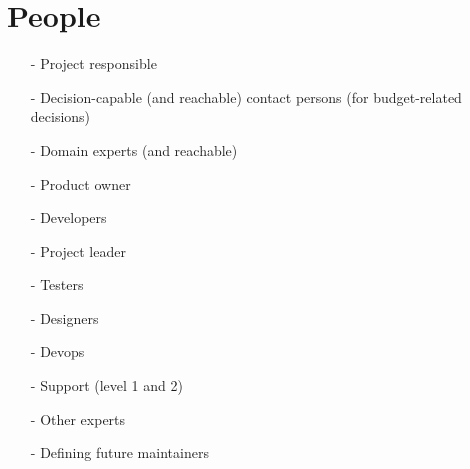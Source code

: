 \documentclass[
	fontsize=10pt, %
	twoside=false, %
	secnumdepth=1, %
]{kaobook}
\begin{document}
\chapter{People}
	\begin{itemize}
		\item[-] Project responsible
		\item[-] Decision-capable (and reachable) contact persons (for budget-related decisions)
		\item[-] Domain experts (and reachable)
		\item[-] Product owner
		\item[-] Developers
		\item[-] Project leader
		\item[-] Testers
		\item[-] Designers
		\item[-] Devops
		\item[-] Support (level 1 and 2)
		\item[-] Other experts
		\item[-] Defining future maintainers
	\end{itemize}
\end{document}
